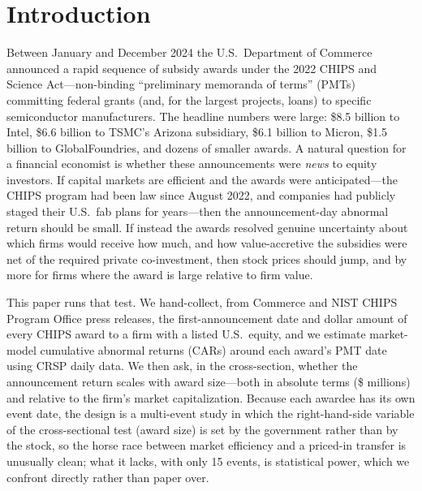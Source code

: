 \documentclass[12pt]{article}
\begin{document}
\begin{abstract}
the configuration of the point estimates---excluding the single distressed leverage point the mean
reaction is $0.3\%$, and no firm but Wolfspeed shows the one-for-one pass-through a windfall
requires. We conclude that CHIPS awards were, on the evidence, largely anticipated and priced in,
and that a cost-share grant tied to mandatory private co-investment need not be a windfall for
equity holders---while being explicit that 15 events cannot decisively exclude a modest windfall.\\[4pt]
\noindent\textbf{JEL:} G14, G12, G38, H81, L52, O25. \quad
\textbf{Keywords:} event study, CHIPS Act, industrial policy, government subsidies,
semiconductors, market efficiency, anticipation, randomization inference, statistical power.
\end{abstract}

\newpage
\section{Introduction}\label{sec:intro}
Between January and December 2024 the U.S.\ Department of Commerce announced a rapid
sequence of subsidy awards under the 2022 CHIPS and Science Act---non-binding
``preliminary memoranda of terms'' (PMTs) committing federal grants (and, for the largest
projects, loans) to specific semiconductor manufacturers. The headline numbers were large:
\$8.5 billion to Intel, \$6.6 billion to TSMC's Arizona subsidiary, \$6.1 billion to
Micron, \$1.5 billion to GlobalFoundries, and dozens of smaller awards. A natural question
for a financial economist is whether these announcements were \emph{news} to equity
investors. If capital markets are efficient and the awards were anticipated---the CHIPS
program had been law since August 2022, and companies had publicly staged their U.S.\
fab plans for years---then the announcement-day abnormal return should be small. If instead
the awards resolved genuine uncertainty about which firms would receive how much, and how
value-accretive the subsidies were net of the required private co-investment, then stock
prices should jump, and by more for firms where the award is large relative to firm value.

This paper runs that test. We hand-collect, from Commerce and NIST CHIPS Program Office
press releases, the first-announcement date and dollar amount of every CHIPS award to a
firm with a listed U.S.\ equity, and we estimate market-model cumulative abnormal returns
(CARs) around each award's PMT date using CRSP daily data. We then ask, in the
cross-section, whether the announcement return scales with award size---both in absolute
terms (\$ millions) and relative to the firm's market capitalization. Because each awardee
has its own event date, the design is a multi-event study in which the right-hand-side
variable of the cross-sectional test (award size) is set by the government rather than by the
stock, so the horse race between market efficiency and a priced-in transfer is unusually
clean; what it lacks, with only 15 events, is statistical power, which we confront directly
rather than paper over.
\end{document}
